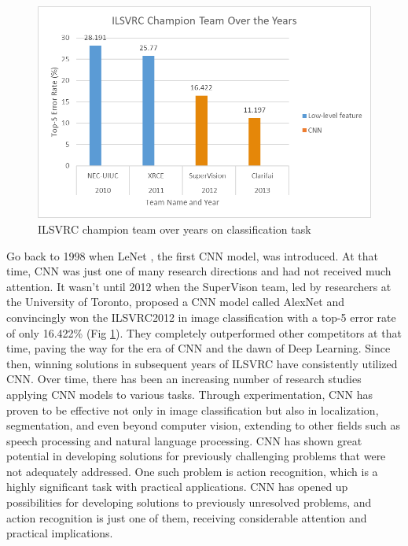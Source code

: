 \documentclass[10pt,onecolumn,letterpaper]{article}
\begin{document}
\begin{figure} [h]
	\centering
	
	\includegraphics[width=1.\linewidth]{fig_info/fig1/ILSVRCChampionTeamOvertheYears}
	\caption{ILSVRC champion team over years on classification task}
	\label{fig:ilsvrcchampionteamovertheyears}
\end{figure}

Go back to 1998 when LeNet \cite{LeNet}, the first CNN model, was introduced. At
that time, CNN was just one of many research directions and had not received
much attention. It wasn't until 2012 when the SuperVison team, led by
researchers at the University of Toronto, proposed a CNN model called AlexNet
and convincingly won the ILSVRC2012 in image classification with a top-5 error
rate of only 16.422\% (Fig \ref{fig:ilsvrcchampionteamovertheyears}). They
completely outperformed other competitors at that time, paving the way for the
era of CNN and the dawn of Deep Learning. Since then, winning solutions in
subsequent years of ILSVRC have consistently utilized CNN. Over time, there has
been an increasing number of research studies applying CNN models to various
tasks. Through experimentation, CNN has proven to be effective not only in image
classification but also in localization, segmentation, and even beyond computer
vision, extending to other fields such as speech processing and natural language
processing. CNN has shown great potential in developing solutions for previously
challenging problems that were not adequately addressed. One such problem is
action recognition, which is a highly significant task with practical
applications. CNN has opened up possibilities for developing solutions to
previously unresolved problems, and action recognition is just one of them,
receiving considerable attention and practical implications.
\end{document}
